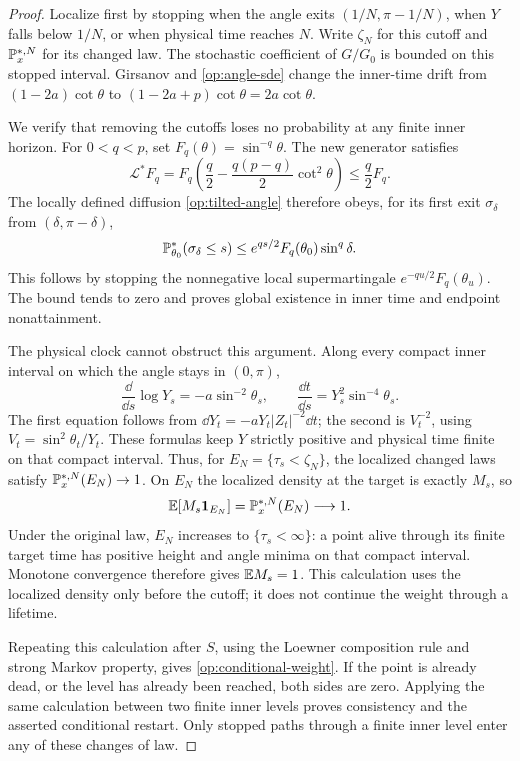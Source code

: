 \begin{proof}
Localize first by stopping when the angle exits $(1/N,\pi-1/N)$,
when $Y$ falls below $1/N$, or when physical time reaches $N$.
Write $\zeta_N$ for this cutoff and $\mathbb P_x^{*,N}$ for its changed law.
The stochastic coefficient of $G/G_0$ is bounded on this stopped
interval. Girsanov and \eqref{op:angle-sde} change the inner-time drift
from $(1-2a)\cot\theta$ to $(1-2a+p)\cot\theta=2a\cot\theta$.

We verify that removing the cutoffs loses no probability at any finite
inner horizon. For $0<q<p$, set $F_q(\theta)=\sin^{-q}\theta$.
The new generator satisfies
\begin{equation}
 \mathcal L^*F_q
 =F_q\left(\frac q2-\frac{q(p-q)}2\cot^2\theta\right)
 \le\frac q2 F_q.
 \label{op:lyapunov}
\end{equation}
The locally defined diffusion \eqref{op:tilted-angle} therefore obeys,
for its first exit $\sigma_\delta$ from $(\delta,\pi-\delta)$,
\[
 \mathbb P^*_{\theta_0}(\sigma_\delta\le s)
 \le e^{qs/2}F_q(\theta_0)\sin^q\delta.
\]
This follows by stopping the nonnegative local supermartingale
$e^{-qu/2}F_q(\theta_u)$. The bound tends to zero and proves global
existence in inner time and endpoint nonattainment.

The physical clock cannot obstruct this argument. Along every compact
inner interval on which the angle stays in $(0,\pi)$,
\begin{equation}
 \frac{\dd}{\dd s}\log Y_s=-a\sin^{-2}\theta_s,
 \qquad
 \frac{\dd t}{\dd s}=Y_s^2\sin^{-4}\theta_s.
 \label{op:physical-clock}
\end{equation}
The first equation follows from $\dd Y_t=-aY_t|Z_t|^{-2}\dd t$;
the second is $V_t^{-2}$, using $V_t=\sin^2\theta_t/Y_t$.
These formulas keep $Y$ strictly positive and physical time finite on
that compact interval. Thus, for $E_N=\{\tau_s<\zeta_N\}$, the
localized changed laws satisfy $\mathbb P_x^{*,N}(E_N)\to1$.
On $E_N$ the localized density at the target is exactly $M_s$, so
\[
 \mathbb E[M_s\mathbf 1_{E_N}]=\mathbb P_x^{*,N}(E_N)\longrightarrow1.
\]
Under the original law, $E_N$ increases to $\{\tau_s<\infty\}$:
a point alive through its finite target time has positive height and
angle minima on that compact interval. Monotone convergence therefore
gives $\mathbb E M_s=1$. This calculation uses the localized density only
before the cutoff; it does not continue the weight through a lifetime.

Repeating this calculation after $S$, using the Loewner composition
rule and strong Markov property, gives \eqref{op:conditional-weight}.
If the point is already dead, or the level has already been reached,
both sides are zero. Applying the same calculation between two finite
inner levels proves consistency and the asserted conditional restart.
Only stopped paths through a finite inner level enter any of these
changes of law.
\end{proof}

